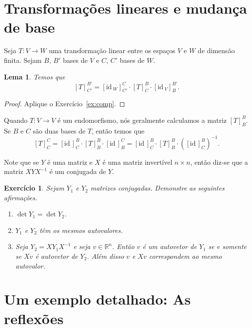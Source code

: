 \documentclass[12pt]{amsart}
\newcommand{\R}{\mathbb R}
\newcommand{\id}{\mbox{id}\,}
\newtheorem{lemma}[theorem]{Lema}
\newtheorem{exercise}[theorem]{Exercício}
\theoremstyle{definition}
\begin{document}
\section{Transformações lineares e mudança de base}

Seja $T:V\to W$ uma transformação linear entre os espaços $V$ e $W$ de dimensão finita. Sejam 
$B$, $B'$ bases de $V$ e $C$, $C'$ bases de $W$. 

\begin{lemma}
    Temos que 
    \[
        [T]_{C'}^{B'}=[\id_W]_{C'}^C\cdot [T]^B_C\cdot [\id_V]_B^{B'}.        
    \]
\end{lemma}
\begin{proof}
    Aplique o Exercício~\ref{ex:comp}.
\end{proof}

Quando $T:V\to V$ é um endomorfismo, nós geralmente calculamos a matriz $[T]_B^B$. Se $B$ e $C$ são duas bases de $T$, então temos que 
\[
    [T]_C^C=[\id]_C^B\cdot [T]_B^B\cdot [\id]_B^C=[\id]_C^B\cdot [T]_B^B\cdot([\id]_C^B)^{-1}.
\]

Note que se $Y$ é uma matriz e $X$ é uma matriz invertível $n\times n$, então diz-se que a 
 matriz $XYX^{-1}$ é um conjugada de $Y$. 

 \begin{exercise}
    Sejam $Y_1$ e $Y_2$ matrizes conjugadas. Demonstre as seguintes afirmações. 
    \begin{enumerate}
        \item $\det Y_1=\det Y_2$.
        \item $Y_1$ e $Y_2$ têm os mesmos autovalores.
        \item Seja $Y_2=XY_1X^{-1}$ e seja $v\in\R^n$. Então $v$ é um autovetor de $Y_1$ se e somente se 
        $Xv$ é autovetor de $Y_2$. Além disso $v$ e $Xv$ correspondem ao mesmo autovalor.
    \end{enumerate}
 \end{exercise}

\section{Um exemplo detalhado: As reflexões}
\end{document}
